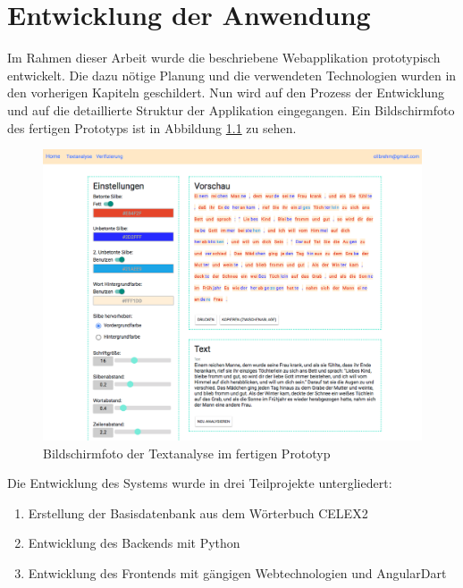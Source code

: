 
\chapter{Entwicklung der Anwendung}

Im Rahmen dieser Arbeit wurde die beschriebene Webapplikation prototypisch entwickelt. Die dazu nötige Planung und die verwendeten Technologien wurden in den vorherigen Kapiteln geschildert. Nun wird auf den Prozess der Entwicklung und auf die detaillierte Struktur der Applikation eingegangen. Ein Bildschirmfoto des fertigen Prototyps ist in Abbildung \ref{fig:textanalyse} zu sehen.

\begin{figure}[h!]
	\centering
	\includegraphics[width=.9\linewidth, frame]{figures/frontend/textanalyse}
	\caption{Bildschirmfoto der Textanalyse im fertigen Prototyp}
	\label{fig:textanalyse}
\end{figure}

Die Entwicklung des Systems wurde in drei Teilprojekte untergliedert:
\begin{enumerate}
	\item Erstellung der Basisdatenbank aus dem Wörterbuch CELEX2
	\item Entwicklung des Backends mit Python
	\item Entwicklung des Frontends mit gängigen Webtechnologien und AngularDart
\end{enumerate}

